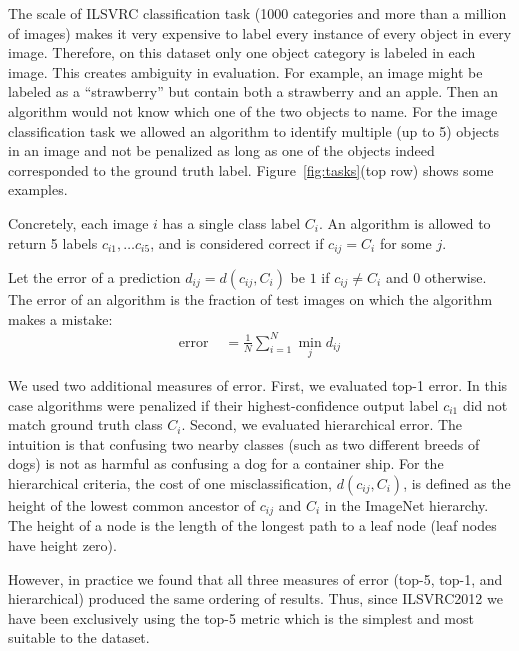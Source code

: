 The scale of ILSVRC classification task (1000 categories and more than a million of images) makes it very expensive to label every instance of every object in every image.  Therefore, on this dataset only one object category is labeled in each image. This creates ambiguity in evaluation. For example, an image might be labeled as a ``strawberry'' but contain both a strawberry and an apple. Then an algorithm would not know which one of the two objects to name. For the image classification task we allowed an algorithm to identify multiple (up to 5) objects in an image and not be penalized as long as one of the objects indeed corresponded to the ground truth label. Figure~\ref{fig:tasks}(top row) shows some examples.

Concretely, each image $i$ has a single class label $C_i$. An algorithm is allowed to return 5 labels $c_{i1},\dots c_{i5}$, and is considered correct if $c_{ij} = C_i$ for some $j$. 

Let the error of a prediction $d_{ij} = d(c_{ij},C_i)$ be $1$ if $c_{ij} \neq C_i$ and $0$ otherwise. The error of an algorithm
is the fraction of test images on which the algorithm makes a mistake:
\begin{align}
\label{eq:clserror}
\mbox{error } &= \frac{1}{N} \sum_{i=1}^N \min_j d_{ij} %
\end{align}

We used two additional measures of error. First, we evaluated top-1 error. In this case algorithms were penalized if their highest-confidence output label $c_{i1}$ did not match ground truth class $C_i$. Second, we evaluated hierarchical error. The intuition is that confusing two nearby classes (such as two different breeds of dogs) is not as harmful as confusing a dog for a container ship. For the hierarchical criteria, the cost of one misclassification, $d(c_{ij},C_i)$, is defined as the height of the lowest common ancestor of $c_{ij}$
and $C_i$ in the ImageNet hierarchy.  The height of a node is the
length of the longest path to a leaf node (leaf nodes have height
zero). 

However, in practice we found that all three measures of error (top-5, top-1, and hierarchical) produced the same ordering of results. Thus, since ILSVRC2012 we have been exclusively using the top-5 metric which is the simplest and most suitable to the dataset.

